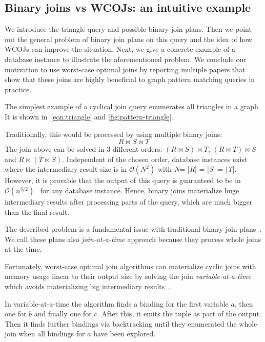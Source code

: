 \subsection{Binary joins vs \textsc{WCOJ}s: an intuitive example} \label{subsec:intuitive-example}
We introduce the triangle query and possible binary join plans.
Then we point out the general problem of binary join plans on this query and the idea of how \textsc{WCOJ}s can improve the situation.
Next, we give a concrete example of a database instance to illustrate the aforementioned problem.
We conclude our motivation to use worst-case optimal joins by reporting multiple papers that show that these joins are highly beneficial
to graph pattern matching queries in practice.

The simplest example of a cyclical join query enumerates all triangles in a graph.
It is shown in~\cref{eqn:triangle} and \cref{fig:pattern-triangle}.

Traditionally, this would be processed by using multiple binary joins:
\begin{equation}
    R \bowtie S \bowtie T
\end{equation}
The join above can be solved in 3 different orders: $ (R \bowtie S) \bowtie T$, $ (R \bowtie T) \bowtie S$ and
$ R \bowtie (T \bowtie S)$.
Independent of the chosen order, database instances exist where the intermediary result size is in $\mathcal{O}(N^2)$ with
\textit{N}= |\textit{R}| = |\textit{S}| = |\textit{T}|.
However, it is provable that the output of this query is guaranteed to be in $\mathcal{O}(n^{3/2})$~\cite{agm,skew-strikes-back}
for any database instance.
Hence, binary joins materialize huge intermediary results after processing parts of the query,
which are much bigger than the final result.

The described problem is a fundamental issue with traditional binary join plans~\cite{agm,skew-strikes-back}.
We call these plans also \textit{join-at-a-time} approach because they process whole joins at the time.

Fortunately, worst-case optimal join algorithms can materialize cyclic joins with memory usage linear to their output size
by solving the join \textit{variable-at-a-time} which avoids materializing big intermediary results~\cite{lftj,nprr}.

In variable-at-a-time the algorithm finds a binding for the first variable $a$, then one for $b$ and
finally one for $c$.
After this, it emits the tuple as part of the output.
Then it finds further bindings via backtracking until they enumerated the whole join when all bindings for $a$ have been explored.

